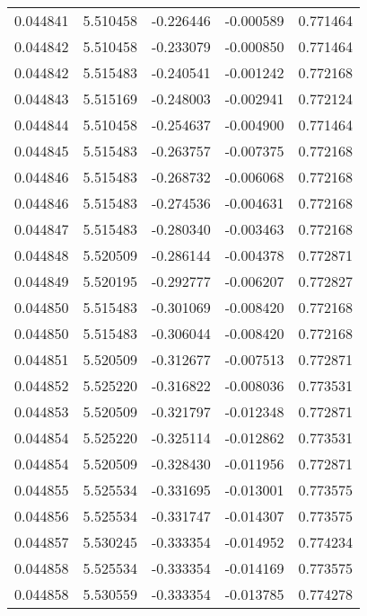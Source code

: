 \begin{tabular}{lrrrr}
0.044841    &  5.510458 & -0.226446 & -0.000589 &             0.771464 \\
0.044842    &  5.510458 & -0.233079 & -0.000850 &             0.771464 \\
0.044842    &  5.515483 & -0.240541 & -0.001242 &             0.772168 \\
0.044843    &  5.515169 & -0.248003 & -0.002941 &             0.772124 \\
0.044844    &  5.510458 & -0.254637 & -0.004900 &             0.771464 \\
0.044845    &  5.515483 & -0.263757 & -0.007375 &             0.772168 \\
0.044846    &  5.515483 & -0.268732 & -0.006068 &             0.772168 \\
0.044846    &  5.515483 & -0.274536 & -0.004631 &             0.772168 \\
0.044847    &  5.515483 & -0.280340 & -0.003463 &             0.772168 \\
0.044848    &  5.520509 & -0.286144 & -0.004378 &             0.772871 \\
0.044849    &  5.520195 & -0.292777 & -0.006207 &             0.772827 \\
0.044850    &  5.515483 & -0.301069 & -0.008420 &             0.772168 \\
0.044850    &  5.515483 & -0.306044 & -0.008420 &             0.772168 \\
0.044851    &  5.520509 & -0.312677 & -0.007513 &             0.772871 \\
0.044852    &  5.525220 & -0.316822 & -0.008036 &             0.773531 \\
0.044853    &  5.520509 & -0.321797 & -0.012348 &             0.772871 \\
0.044854    &  5.525220 & -0.325114 & -0.012862 &             0.773531 \\
0.044854    &  5.520509 & -0.328430 & -0.011956 &             0.772871 \\
0.044855    &  5.525534 & -0.331695 & -0.013001 &             0.773575 \\
0.044856    &  5.525534 & -0.331747 & -0.014307 &             0.773575 \\
0.044857    &  5.530245 & -0.333354 & -0.014952 &             0.774234 \\
0.044858    &  5.525534 & -0.333354 & -0.014169 &             0.773575 \\
0.044858    &  5.530559 & -0.333354 & -0.013785 &             0.774278 \\

\end{tabular}
